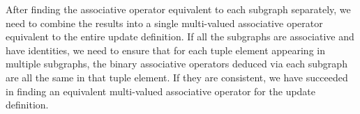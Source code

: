 


After finding the associative operator equivalent to each subgraph separately, we need to combine the results into a single multi-valued associative operator equivalent to the entire update definition. If all the subgraphs are associative and have identities, we need to ensure that for each tuple element appearing in multiple subgraphs, the binary associative operators deduced via each subgraph are all the same in that tuple element. If they are consistent, we have succeeded in finding an equivalent multi-valued associative operator for the update definition.

